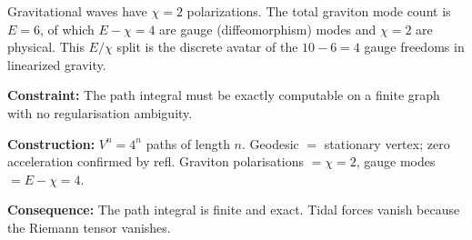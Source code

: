\documentclass[11pt,a4paper]{book}
\def\texttt#1{#1}%
\newcommand{\VoidRef}[2]{\textit{#2} (in \textit{Void})}
\begin{document}
Gravitational waves have $\chi = 2$ polarizations. The total graviton mode count is $E = 6$, of which $E - \chi = 4$ are gauge (diffeomorphism) modes and $\chi = 2$ are physical. This $E/\chi$ split is the discrete avatar of the $10 - 6 = 4$ gauge freedoms in linearized gravity.


\textbf{Constraint:} The path integral must be exactly computable on a finite graph with no regularisation ambiguity.

\textbf{Construction:} $V^n = 4^n$ paths of length $n$. Geodesic $=$ stationary vertex; zero acceleration confirmed by \texttt{refl}. Graviton polarisations $= \chi = 2$, gauge modes $= E - \chi = 4$.

\textbf{Consequence:} The path integral is finite and exact. Tidal forces vanish because the Riemann tensor vanishes.
\end{document}
